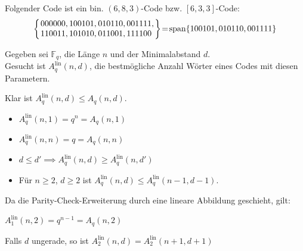 \documentclass{cheat-sheet}
\newcommand{\F}{\mathbb{F}} %
\DeclareMathOperator{\spann}{span} %
\newcommand{\lin}{\text{lin}} %
\begin{document}
\begin{bsp}
  Folgender Code ist ein bin. $(6, 8, 3)$-Code bzw. $[6, 3, 3]$-Code:
  \[
    \arraycolsep=1pt
    \left\{ \begin{array}{rl}
      000000,
      100101,
      & 010110,
      001111, \\
      110011,
      101010,
      & 011001,
      111100
    \end{array} \right\} \!=\! \spann \{ 100101, 010110, 001111 \}
  \]
\end{bsp}



\begin{prob}
  Gegeben sei $\F_q$, die Länge $n$ und der Minimalabstand $d$. \\
  Gesucht ist $A_q^\lin(n, d)$, die bestmögliche Anzahl Wörter eines Codes mit diesen Parametern.
\end{prob}

\begin{bem}
  Klar ist $A_q^\lin(n, d) \leq A_q(n, d)$.
\end{bem}

\begin{lem}
  \begin{itemize}
    \item $A_q^\lin(n, 1) = q^n = A_q(n, 1)$
    \item $A_q^\lin(n, n) = q = A_q(n, n)$
    \item $d \leq d' \implies A_q^\lin(n, d) \geq A_q^\lin(n, d')$
    \item Für $n \geq 2$, $d \geq 2$ ist $A_q^\lin(n, d) \leq A_q^\lin(n-1, d-1)$.
  \end{itemize}
\end{lem}

\begin{bem}
  Da die Parity-Check-Erweiterung durch eine lineare Abbildung geschieht, gilt:
\end{bem}

\begin{satz}
  $A_1^\lin(n, 2) = q^{n-1} = A_q(n,2)$
\end{satz}

\begin{satz}
  Falls $d$ ungerade, so ist $A_2^\lin(n, d) = A_2^\lin(n+1, d+1)$
\end{satz}
\end{document}
